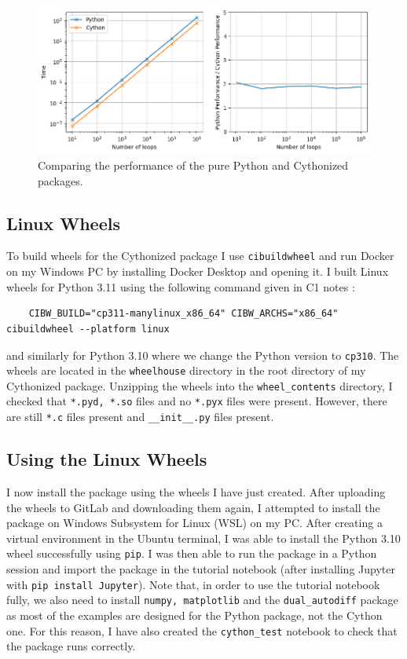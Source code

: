 \documentclass{article}
\begin{document}
\begin{figure}
    \centering
    \includegraphics[width=1\linewidth]{q9_timeit.png}
    \caption{Comparing the performance of the pure Python and Cythonized packages.}
    \label{fig:q9_timeit}
\end{figure}

\subsection{Linux Wheels}
To build wheels for the Cythonized package I use \texttt{cibuildwheel} and run Docker on my Windows PC by installing Docker Desktop and opening it. I built Linux wheels for Python 3.11 using the following command given in C1 notes \cite{research_computing_docs}:
\begin{lstlisting}
    CIBW_BUILD="cp311-manylinux_x86_64" CIBW_ARCHS="x86_64" cibuildwheel --platform linux
\end{lstlisting}
 and similarly for Python 3.10 where we change the Python version to \texttt{cp310}. The wheels are located in the \texttt{wheelhouse} directory in the root directory of my Cythonized package. Unzipping the wheels into the \texttt{wheel\_contents} directory, I checked that \texttt{*.pyd, *.so} files and no \texttt{*.pyx} files were present. However, there are still \texttt{*.c} files present and \texttt{\_\_init\_\_.py} files present.

 \subsection{ Using the Linux Wheels }

I now install the package using the wheels I have just created. After uploading the wheels to GitLab and downloading them again, I attempted to install the package on Windows Subsystem for Linux (WSL) on my PC. After creating a virtual environment in the Ubuntu terminal, I was able to install the Python 3.10 wheel successfully using \texttt{pip}. I was then able to run the package in a Python session and import the package in the tutorial notebook (after installing Jupyter with \texttt{pip install Jupyter}). Note that, in order to use the tutorial notebook fully, we also need to install \texttt{numpy, matplotlib} and the \texttt{dual\_autodiff} package as most of the examples are designed for the Python package, not the Cython one. For this reason, I have also created the \texttt{cython\_test} notebook to check that the package runs correctly. 
\end{document}
